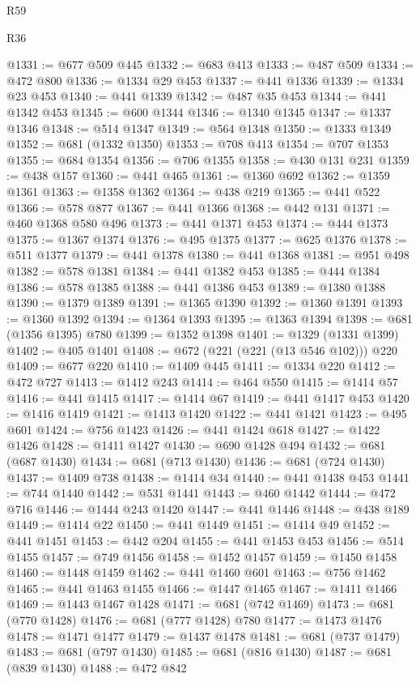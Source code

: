 \begin{lexlean}{R59}
\begin{lexlean}{R36}
\begin{coremodule}
{{{{{{{{{{{{{{{{{{{{{{{{{{{{{{{{{{{{{{{{{{{{{{{{{{{{{{{{{{{{{{{{{{{{{{{{{{{{{{{{{{@1331 := @677 @509 @445
@1332 := @683 @413
@1333 := @487 @509
@1334 := @472 @800
@1336 := @1334 @29 @453
@1337 := @441 @1336
@1339 := @1334 @23 @453
@1340 := @441 @1339
@1342 := @487 @35 @453
@1344 := @441 @1342 @453
@1345 := @600 @1344
@1346 := @1340 @1345
@1347 := @1337 @1346
@1348 := @514 @1347
@1349 := @564 @1348
@1350 := @1333 @1349
@1352 := @681 (@1332 @1350)
@1353 := @708 @413
@1354 := @707 @1353
@1355 := @684 @1354
@1356 := @706 @1355
@1358 := @430 @131 @231
@1359 := @438 @157
@1360 := @441 @465
@1361 := @1360 @692
@1362 := @1359 @1361
@1363 := @1358 @1362
@1364 := @438 @219
@1365 := @441 @522
@1366 := @578 @877
@1367 := @441 @1366
@1368 := @442 @131
@1371 := @460 @1368 @580 @496
@1373 := @441 @1371 @453
@1374 := @444 @1373
@1375 := @1367 @1374
@1376 := @495 @1375
@1377 := @625 @1376
@1378 := @511 @1377
@1379 := @441 @1378
@1380 := @441 @1368
@1381 := @951 @498
@1382 := @578 @1381
@1384 := @441 @1382 @453
@1385 := @444 @1384
@1386 := @578 @1385
@1388 := @441 @1386 @453
@1389 := @1380 @1388
@1390 := @1379 @1389
@1391 := @1365 @1390
@1392 := @1360 @1391
@1393 := @1360 @1392
@1394 := @1364 @1393
@1395 := @1363 @1394
@1398 := @681 (@1356 @1395) @780
@1399 := @1352 @1398
@1401 := @1329 (@1331 @1399)
@1402 := @405 @1401
@1408 := @672 (@221 (@221 (@13 @546 @102))) @220
@1409 := @677 @220
@1410 := @1409 @445
@1411 := @1334 @220
@1412 := @472 @727
@1413 := @1412 @243
@1414 := @464 @550
@1415 := @1414 @57
@1416 := @441 @1415
@1417 := @1414 @67
@1419 := @441 @1417 @453
@1420 := @1416 @1419
@1421 := @1413 @1420
@1422 := @441 @1421
@1423 := @495 @601
@1424 := @756 @1423
@1426 := @441 @1424 @618
@1427 := @1422 @1426
@1428 := @1411 @1427
@1430 := @690 @1428 @494
@1432 := @681 (@687 @1430)
@1434 := @681 (@713 @1430)
@1436 := @681 (@724 @1430)
@1437 := @1409 @738
@1438 := @1414 @34
@1440 := @441 @1438 @453
@1441 := @744 @1440
@1442 := @531 @1441
@1443 := @460 @1442
@1444 := @472 @716
@1446 := @1444 @243 @1420
@1447 := @441 @1446
@1448 := @438 @189
@1449 := @1414 @22
@1450 := @441 @1449
@1451 := @1414 @49
@1452 := @441 @1451
@1453 := @442 @204
@1455 := @441 @1453 @453
@1456 := @514 @1455
@1457 := @749 @1456
@1458 := @1452 @1457
@1459 := @1450 @1458
@1460 := @1448 @1459
@1462 := @441 @1460 @601
@1463 := @756 @1462
@1465 := @441 @1463 @1455
@1466 := @1447 @1465
@1467 := @1411 @1466
@1469 := @1443 @1467 @1428
@1471 := @681 (@742 @1469)
@1473 := @681 (@770 @1428)
@1476 := @681 (@777 @1428) @780
@1477 := @1473 @1476
@1478 := @1471 @1477
@1479 := @1437 @1478
@1481 := @681 (@737 @1479)
@1483 := @681 (@797 @1430)
@1485 := @681 (@816 @1430)
@1487 := @681 (@839 @1430)
@1488 := @472 @842
}}}}}}}}}}}}}}}}}}}}}}}}}}}}}}}}}}}}}}}}}}}}}}}}}}}}}}}}}}}}}}}}}}}}}}}}}}}}}}}}}}
\end{coremodule}
\end{lexlean}
\end{lexlean}
